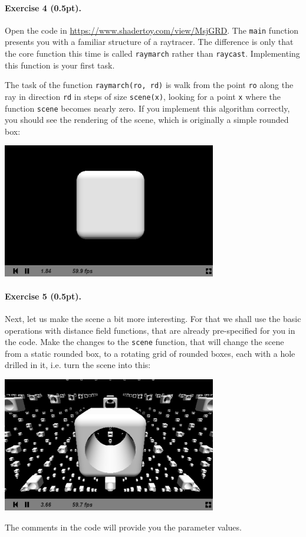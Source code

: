 \documentclass{article}
\newenvironment{exercise}[2]{\paragraph{Exercise #1 (#2pt).} }{
\medskip}
\begin{document}
\begin{exercise}{4}{0.5}
Open the code in \url{https://www.shadertoy.com/view/MsjGRD}. The \texttt{main} function presents you with a familiar structure of a raytracer. The difference is only that the core function this time is called \texttt{raymarch} rather than \texttt{raycast}. Implementing this function is your first task. 

The task of the function \texttt{raymarch(ro, rd)} is walk from the point \texttt{ro} along the ray in direction \texttt{rd} in steps of size \texttt{scene(x)}, looking for a point \texttt{x} where the function \texttt{scene} becomes nearly zero. If you implement this algorithm correctly, you should see the rendering of the scene, which is originally a simple rounded box:
\begin{center}
\includegraphics[width=0.7\textwidth]{raymarching1.png}
\end{center}
\end{exercise}


\begin{exercise}{5}{0.5}
Next, let us make the scene a bit more interesting. For that we shall use the basic operations with distance field functions, that are already pre-specified for you in the code. Make the changes to the \texttt{scene} function, that will change the scene from a static rounded box, to a rotating grid of rounded boxes, each with a hole drilled in it, i.e. turn the scene into this:
\begin{center}
\includegraphics[width=0.7\textwidth]{raymarching2.png}
\end{center}
The comments in the code will provide you the parameter values.
\end{exercise}
\end{document}
